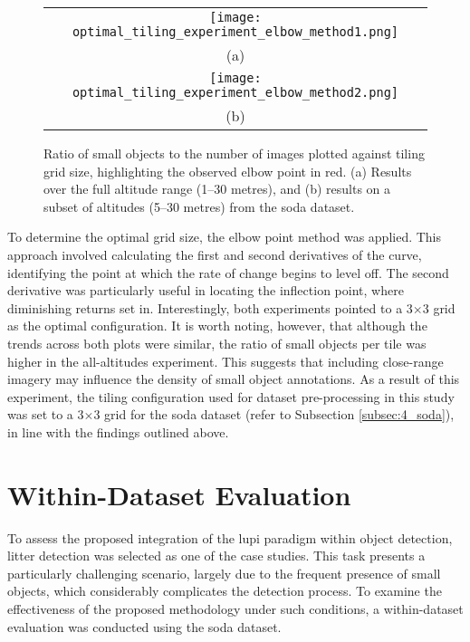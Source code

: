 \begin{figure}[!ht]
  \centering
  \begin{tabular}{c}
    \texttt{[image: optimal\_tiling\_experiment\_elbow\_method1.png]} \\
    \small (a) \\
    \addlinespace[1em]
    \texttt{[image: optimal\_tiling\_experiment\_elbow\_method2.png]} \\
    \small (b) \\
  \end{tabular}
  \caption{Ratio of small objects to the number of images plotted against tiling grid size, highlighting the observed elbow point in red. (a) Results over the full altitude range (1--30 metres), and (b) results on a subset of altitudes (5--30 metres) from the \gls{soda} dataset.}
  \label{fig:elbow_plot}
\end{figure}

To determine the optimal grid size, the elbow point \cite{elbow_point} method was applied. This approach involved calculating the first and second derivatives of the curve, identifying the point at which the rate of change begins to level off. The second derivative was particularly useful in locating the inflection point, where diminishing returns set in.
Interestingly, both experiments pointed to a 3$\times$3 grid as the optimal configuration. It is worth noting, however, that although the trends across both plots were similar, the ratio of small objects per tile was higher in the all-altitudes experiment. This suggests that including close-range imagery may influence the density of small object annotations.
As a result of this experiment, the tiling configuration used for dataset pre-processing in this study was set to a 3$\times$3 grid for the \gls{soda} dataset (refer to Subsection \ref{subsec:4_soda}), in line with the findings outlined above.

\section{Within-Dataset Evaluation}
\label{sec:5_within_dataset_exp}


To assess the proposed integration of the \gls{lupi} paradigm within object detection, litter detection was selected as one of the case studies. This task presents a particularly challenging scenario, largely due to the frequent presence of small objects, which considerably complicates the detection process. To examine the effectiveness of the proposed methodology under such conditions, a within-dataset evaluation was conducted using the \gls{soda} dataset.

